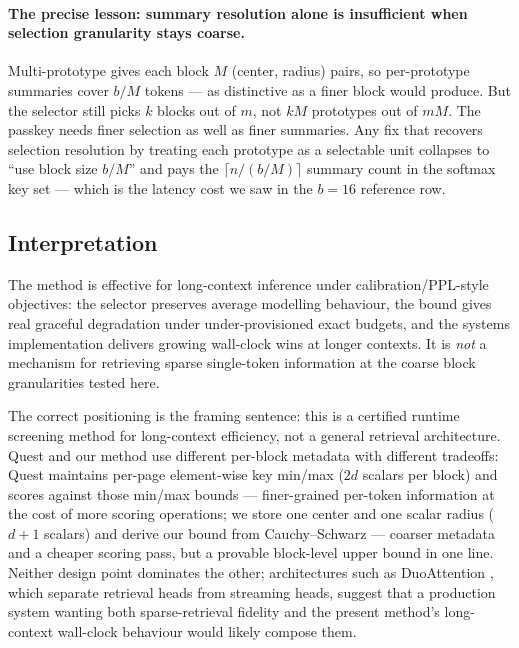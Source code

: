 \documentclass[11pt]{article}
\theoremstyle{plain}
\theoremstyle{definition}
\begin{document}
\paragraph{The precise lesson: summary resolution alone is insufficient
when selection granularity stays coarse.} Multi-prototype gives each
block $M$ (center, radius) pairs, so per-prototype summaries cover
$b/M$ tokens --- as distinctive as a finer block would produce. But the
selector still picks $k$ blocks out of $m$, not $kM$ prototypes out of
$mM$. The passkey needs finer selection as well as finer summaries. Any
fix that recovers selection resolution by treating each prototype as a
selectable unit collapses to ``use block size $b/M$'' and pays the
$\lceil n/(b/M) \rceil$ summary count in the softmax key set --- which
is the latency cost we saw in the $b = 16$ reference row.

\subsection{Interpretation}
\label{sec:interpretation}

The method is effective for long-context inference under calibration/PPL-style
objectives: the selector preserves average modelling behaviour, the bound
gives real graceful degradation under under-provisioned exact budgets,
and the systems implementation delivers growing wall-clock wins at longer
contexts. It is \emph{not} a mechanism for retrieving sparse single-token
information at the coarse block granularities tested here.

The correct positioning is the framing sentence: this is a certified
runtime screening method for long-context efficiency, not a general
retrieval architecture. Quest \citep{tang2024quest} and our method use
different per-block metadata with different tradeoffs: Quest maintains
per-page element-wise key min/max ($2d$ scalars per block) and scores
against those min/max bounds --- finer-grained per-token information at
the cost of more scoring operations; we store one center and one scalar
radius ($d + 1$ scalars) and derive our bound from Cauchy--Schwarz
--- coarser metadata and a cheaper scoring pass, but a provable
block-level upper bound in one line. Neither design point dominates the
other; architectures such as DuoAttention \citep{xiao2024duoattention},
which separate retrieval heads from streaming heads, suggest that a
production system wanting both sparse-retrieval fidelity and the present
method's long-context wall-clock behaviour would likely compose them.
\end{document}
